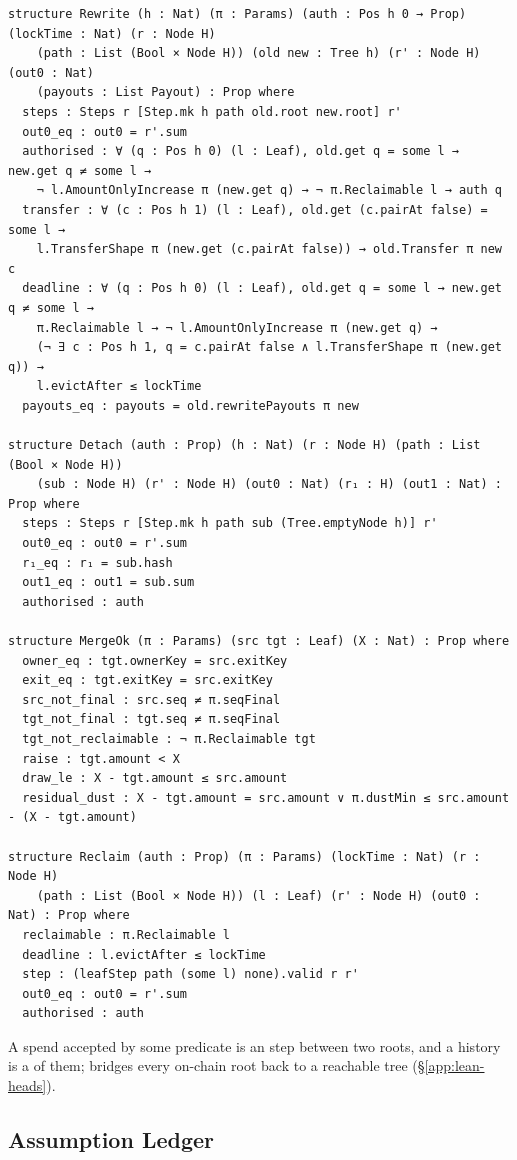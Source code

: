 \begin{lstlisting}[style=leansig]
structure Rewrite (h : Nat) (π : Params) (auth : Pos h 0 → Prop) (lockTime : Nat) (r : Node H)
    (path : List (Bool × Node H)) (old new : Tree h) (r' : Node H) (out0 : Nat)
    (payouts : List Payout) : Prop where
  steps : Steps r [Step.mk h path old.root new.root] r'
  out0_eq : out0 = r'.sum
  authorised : ∀ (q : Pos h 0) (l : Leaf), old.get q = some l → new.get q ≠ some l →
    ¬ l.AmountOnlyIncrease π (new.get q) → ¬ π.Reclaimable l → auth q
  transfer : ∀ (c : Pos h 1) (l : Leaf), old.get (c.pairAt false) = some l →
    l.TransferShape π (new.get (c.pairAt false)) → old.Transfer π new c
  deadline : ∀ (q : Pos h 0) (l : Leaf), old.get q = some l → new.get q ≠ some l →
    π.Reclaimable l → ¬ l.AmountOnlyIncrease π (new.get q) →
    (¬ ∃ c : Pos h 1, q = c.pairAt false ∧ l.TransferShape π (new.get q)) →
    l.evictAfter ≤ lockTime
  payouts_eq : payouts = old.rewritePayouts π new

structure Detach (auth : Prop) (h : Nat) (r : Node H) (path : List (Bool × Node H))
    (sub : Node H) (r' : Node H) (out0 : Nat) (r₁ : H) (out1 : Nat) : Prop where
  steps : Steps r [Step.mk h path sub (Tree.emptyNode h)] r'
  out0_eq : out0 = r'.sum
  r₁_eq : r₁ = sub.hash
  out1_eq : out1 = sub.sum
  authorised : auth

structure MergeOk (π : Params) (src tgt : Leaf) (X : Nat) : Prop where
  owner_eq : tgt.ownerKey = src.exitKey
  exit_eq : tgt.exitKey = src.exitKey
  src_not_final : src.seq ≠ π.seqFinal
  tgt_not_final : tgt.seq ≠ π.seqFinal
  tgt_not_reclaimable : ¬ π.Reclaimable tgt
  raise : tgt.amount < X
  draw_le : X - tgt.amount ≤ src.amount
  residual_dust : X - tgt.amount = src.amount ∨ π.dustMin ≤ src.amount - (X - tgt.amount)

structure Reclaim (auth : Prop) (π : Params) (lockTime : Nat) (r : Node H)
    (path : List (Bool × Node H)) (l : Leaf) (r' : Node H) (out0 : Nat) : Prop where
  reclaimable : π.Reclaimable l
  deadline : l.evictAfter ≤ lockTime
  step : (leafStep path (some l) none).valid r r'
  out0_eq : out0 = r'.sum
  authorised : auth
\end{lstlisting}

A spend accepted by some predicate is an  step between two
roots, and a history is a  of them;  bridges
every on-chain root back to a reachable tree (\S\ref{app:lean-heads}).


\subsection{Assumption Ledger}

